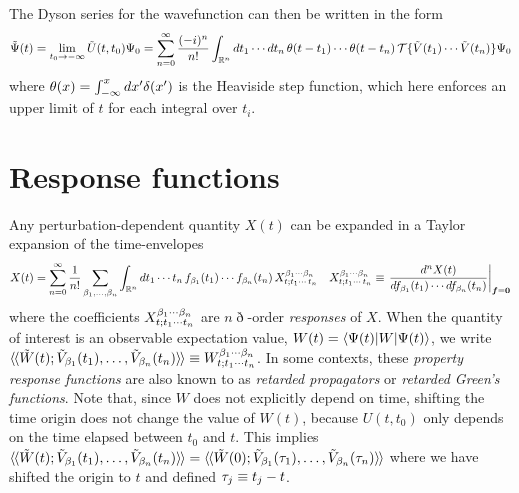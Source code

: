 \documentclass[11pt]{article}
\numberwithin{equation}{section}
\begin{document}
\begin{rmk}
The Dyson series for the wavefunction can then be written in the form
\begin{align}
\label{eq:wavefunction-dyson-series}
  \tilde{\Psi }(t)
=
  \lim_{t_0\rightarrow-\infty}
  \tilde{U}(t,t_0)
  \Psi _0
=
  \sum_{n=0}^\infty
  \frac {(-i)^n}{n!}
  \int_{\mathbb{R}^n}
  dt_1\cdots dt_n\,
  \theta (t-t_1)
  \cdots
  \theta (t-t_n)\,
  \mathcal{T}\{
    \tilde{V}(t_1)
    \cdots
    \tilde{V}(t_n)
  \}
  \Psi _0
\end{align}
where
$
  \theta (x)
=
  \int_{-\infty}^x
  dx'
  \delta (x')
$
is the Heaviside step function, which here enforces an upper limit of $t$ for each integral over $t_i$.
\end{rmk}



\newpage
\section{Response functions}
\label{appendix:response-functions}


\begin{dfn}
Any perturbation-dependent quantity $X(t)$ can be expanded in a Taylor expansion of the time-envelopes
\begin{align}
\label{eq:general-perturbation-expansion}
  X(t)
=
  \sum_{n=0}^\infty
  \fr{1}{n!}
  \sum_{\b_1,\ld,\b_n}
  \int_{\mb{R}^n}
  dt_1\cd t_n\,
  f_{\b_1}(t_1)
  \cd
  f_{\b_n}(t_n)\,
  X^{\b_1\cd \b_n}_{t;t_1\cd\,t_n}
&&
  X^{\b_1\cd \b_n}_{t;t_1\cd\,t_n}
\equiv
  \left.
  \fd{^n
    X(t)
  }{
    f_{\b_1}(t_1)
    \cd
    df_{\b_n}(t_n)
  }
  \right|_{\bm{f}=\bo{0}}
\end{align}
where the coefficients $X_{t;t_1\cdots t_n}^{\beta _1\cdots \beta _n}$ are $n\eth$-order \textit{responses} of $X$.
When the quantity of interest is an observable expectation value, $W(t)=\langle\Psi (t)|W|\Psi (t)\rangle$, we write
$
  {{\langle}\hspace{-1pt}{\langle}} \tilde{W}(t); \tilde{V}_{\beta _1}(t_1),\ldots,\tilde{V}_{\beta _n}(t_n) {{\rangle}\hspace{-1pt}{\rangle}}
\equiv
  W_{t;t_1\cdots t_n}^{\beta _1\cdots \beta _n}
$.
In some contexts, these \textit{property response functions} are also known to as \textit{retarded propagators} or \textit{retarded Green's functions}.
Note that, since $W$ does not explicitly depend on time, shifting the time origin does not change the value of $W(t)$, because $U(t,t_0)$ only depends on the time elapsed between $t_0$ and $t$.
This implies
$
  {{\langle}\hspace{-1pt}{\langle}} \tilde{W}(t);\tilde{V}_{\beta _1}(t_1),\ldots,\tilde{V}_{\beta _n}(t_n) {{\rangle}\hspace{-1pt}{\rangle}}
=
  {{\langle}\hspace{-1pt}{\langle}} \tilde{W}(0);\tilde{V}_{\beta _1}(\tau _1),\ldots,\tilde{V}_{\beta _n}(\tau _n) {{\rangle}\hspace{-1pt}{\rangle}}
$
where we have shifted the origin to $t$ and defined $\tau _j\equiv t_j-t$.
\end{dfn}
\end{document}
